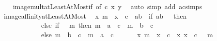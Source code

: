 \begin{isabellebody}
%
\isadelimproof
\ \ %
\endisadelimproof
%
\isatagproof
{}\isamarkupfalse%
\ image{\isacharunderscore}{\kern0pt}mult{\isacharunderscore}{\kern0pt}atLeastAtMost{\isacharunderscore}{\kern0pt}if\ {\isacharbrackleft}{\kern0pt}of\ c\ x\ y{\isacharbrackright}{\kern0pt}\ \isamarkupfalse%
\ {\isacharparenleft}{\kern0pt}auto\ simp\ add{\isacharcolon}{\kern0pt}\ ac{\isacharunderscore}{\kern0pt}simps{\isacharparenright}{\kern0pt}%
\endisatagproof
{\isafoldproof}%
%
\isadelimproof
\isanewline
%
\endisadelimproof
\isanewline
{}\isamarkupfalse%
\ image{\isacharunderscore}{\kern0pt}affinity{\isacharunderscore}{\kern0pt}atLeastAtMost{\isacharcolon}{\kern0pt}\isanewline
\ \ {\isachardoublequoteopen}{\isacharparenleft}{\kern0pt}{\isacharparenleft}{\kern0pt}{\isasymlambda}x{\isachardot}{\kern0pt}\ m\ {\isacharasterisk}{\kern0pt}\ x\ {\isacharplus}{\kern0pt}\ c{\isacharparenright}{\kern0pt}\ {\isacharbackquote}{\kern0pt}\ {\isacharbraceleft}{\kern0pt}a{\isachardot}{\kern0pt}{\isachardot}{\kern0pt}b{\isacharbraceright}{\kern0pt}{\isacharparenright}{\kern0pt}\ {\isacharequal}{\kern0pt}\ {\isacharparenleft}{\kern0pt}if\ {\isacharbraceleft}{\kern0pt}a{\isachardot}{\kern0pt}{\isachardot}{\kern0pt}b{\isacharbraceright}{\kern0pt}\ {\isacharequal}{\kern0pt}\ {\isacharbraceleft}{\kern0pt}{\isacharbraceright}{\kern0pt}\ then\ {\isacharbraceleft}{\kern0pt}{\isacharbraceright}{\kern0pt}\isanewline
\ \ \ \ \ \ \ \ \ \ \ \ else\ if\ {}\ {\isasymle}\ m\ then\ {\isacharbraceleft}{\kern0pt}m\ {\isacharasterisk}{\kern0pt}\ a\ {\isacharplus}{\kern0pt}\ c\ {\isachardot}{\kern0pt}{\isachardot}{\kern0pt}\ m\ {\isacharasterisk}{\kern0pt}\ b\ {\isacharplus}{\kern0pt}\ c{\isacharbraceright}{\kern0pt}\isanewline
\ \ \ \ \ \ \ \ \ \ \ \ else\ {\isacharbraceleft}{\kern0pt}m\ {\isacharasterisk}{\kern0pt}\ b\ {\isacharplus}{\kern0pt}\ c\ {\isachardot}{\kern0pt}{\isachardot}{\kern0pt}\ m\ {\isacharasterisk}{\kern0pt}\ a\ {\isacharplus}{\kern0pt}\ c{\isacharbraceright}{\kern0pt}{\isacharparenright}{\kern0pt}{\isachardoublequoteclose}\isanewline
%
\isadelimproof
%
\endisadelimproof
%
\isatagproof
{}\isamarkupfalse%
\ {\isacharminus}{\kern0pt}\isanewline
\ \ \isamarkupfalse%
\ {\isacharasterisk}{\kern0pt}{\isacharcolon}{\kern0pt}\ {\isachardoublequoteopen}{\isacharparenleft}{\kern0pt}{\isasymlambda}x{\isachardot}{\kern0pt}\ m\ {\isacharasterisk}{\kern0pt}\ x\ {\isacharplus}{\kern0pt}\ c{\isacharparenright}{\kern0pt}\ {\isacharequal}{\kern0pt}\ {\isacharparenleft}{\kern0pt}{\isacharparenleft}{\kern0pt}{\isasymlambda}x{\isachardot}{\kern0pt}\ x\ {\isacharplus}{\kern0pt}\ c{\isacharparenright}{\kern0pt}\ {\isasymcirc}\ {\isacharparenleft}{\kern0pt}{\isacharasterisk}{\kern0pt}{\isacharparenright}{\kern0pt}\ m{\isacharparenright}{\kern0pt}{\isachardoublequoteclose}\isanewline

\end{isabellebody}
